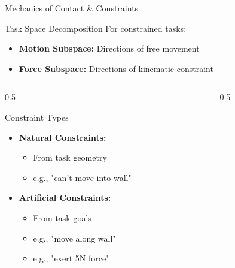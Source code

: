 \documentclass[10pt]{beamer}
\begin{document}
\begin{frame}{Mechanics of Contact \& Constraints}
    \begin{block}{Task Space Decomposition}
        For constrained tasks:
        \begin{itemize}
            \item \textbf{Motion Subspace:} Directions of free movement
            \item \textbf{Force Subspace:} Directions of kinematic constraint
        \end{itemize}
    \end{block}
    
    \begin{columns}
        \begin{column}{0.5\textwidth}
            \begin{exampleblock}{Constraint Types}
                \begin{itemize}
                    \item \textbf{Natural Constraints:}
                    \begin{itemize}
                        \footnotesize
                        \item From task geometry
                        \item e.g., "can't move into wall"
                    \end{itemize}
                    \item \textbf{Artificial Constraints:}
                    \begin{itemize}
                        \footnotesize
                        \item From task goals
                        \item e.g., "move along wall"
                        \item e.g., "exert 5N force"
                    \end{itemize}
                \end{itemize}
            \end{exampleblock}
        \end{column}
        
        \begin{column}{0.5\textwidth}
            \begin{center}
            \end{center}
        \end{column}
    \end{columns}
    

\end{frame}
\end{document}
